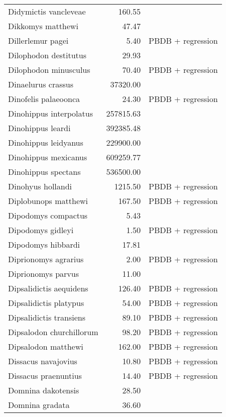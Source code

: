 \begin{table}[ht]
\begin{tabular}{lrl}
  Didymictis vancleveae & 160.55 & \cite{Scott2004} \\ 
  Dikkomys matthewi & 47.47 & \cite{Tomiya2013} \\ 
  Dillerlemur pagei & 5.40 & PBDB + regression \\ 
  Dilophodon destitutus & 29.93 & \cite{Sinclair1915} \\ 
  Dilophodon minusculus & 70.40 & PBDB + regression \\ 
  Dinaelurus crassus & 37320.00 & \cite{McKenna2011} \\ 
  Dinofelis palaeoonca & 24.30 & PBDB + regression \\ 
  Dinohippus interpolatus & 257815.63 & \cite{Tomiya2013} \\ 
  Dinohippus leardi & 392385.48 & \cite{Tomiya2013} \\ 
  Dinohippus leidyanus & 229900.00 & \cite{MacFadden1986} \\ 
  Dinohippus mexicanus & 609259.77 & \cite{Tomiya2013} \\ 
  Dinohippus spectans & 536500.00 & \cite{McKenna2011} \\ 
  Dinohyus hollandi & 1215.50 & PBDB + regression \\ 
  Diplobunops matthewi & 167.50 & PBDB + regression \\ 
  Dipodomys compactus & 5.43 & \cite{Smith2004} \\ 
  Dipodomys gidleyi & 1.50 & PBDB + regression \\ 
  Dipodomys hibbardi & 17.81 & \cite{Tomiya2013} \\ 
  Diprionomys agrarius & 2.00 & PBDB + regression \\ 
  Diprionomys parvus & 11.00 & \cite{McKenna2011} \\ 
  Dipsalidictis aequidens & 126.40 & PBDB + regression \\ 
  Dipsalidictis platypus & 54.00 & PBDB + regression \\ 
  Dipsalidictis transiens & 89.10 & PBDB + regression \\ 
  Dipsalodon churchillorum & 98.20 & PBDB + regression \\ 
  Dipsalodon matthewi & 162.00 & PBDB + regression \\ 
  Dissacus navajovius & 10.80 & PBDB + regression \\ 
  Dissacus praenuntius & 14.40 & PBDB + regression \\ 
  Domnina dakotensis & 28.50 & \cite{Tomiya2013} \\ 
  Domnina gradata & 36.60 & \cite{Tomiya2013} \\ 

\end{tabular}
\end{table}

